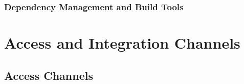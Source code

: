 \documentclass[11pt,fleqn]{book} %
\begin{document}
		\subsection{Dependency Management and Build Tools}	
	
	


\chapter{Access and Integration Channels}

	\section{Access Channels}
\end{document}
